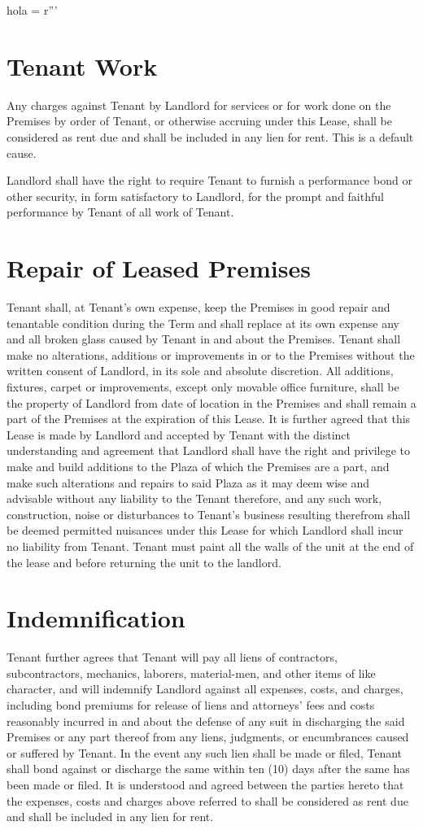 hola = r'''\documentclass{article}
\begin{document}
\section{Tenant Work}
    Any charges against Tenant by Landlord for services or for work done on the Premises by order of Tenant, or otherwise accruing under this Lease, shall be considered as rent due and shall be included in any lien for rent.  This is a default cause.

    Landlord shall have the right to require Tenant to furnish a performance bond or other security, in form satisfactory to Landlord, for the prompt and faithful performance by Tenant of all work of Tenant. 

\section{Repair of Leased Premises}
    Tenant shall, at Tenant's own expense, keep the Premises in good repair and tenantable condition during the Term and shall replace at its own expense any and all broken glass caused by Tenant in and about the Premises. Tenant shall make no alterations, additions or improvements in or to the Premises without the written consent of Landlord, in its sole and absolute discretion. All additions, fixtures, carpet or improvements, except only movable office furniture, shall be the property of Landlord from date of location in the Premises and shall remain a part of the Premises at the expiration of this Lease.
    It is further agreed that this Lease is made by Landlord and accepted by Tenant with the distinct understanding and agreement that Landlord shall have the right and privilege to make and build additions to the Plaza of which the Premises are a part, and make such alterations and repairs to said Plaza as it may deem wise and advisable without any liability to the Tenant therefore, and any such work, construction, noise or disturbances to Tenant’s business resulting therefrom shall be deemed permitted nuisances under this Lease for which Landlord shall incur no liability from Tenant.  Tenant must paint all the walls of the unit at the end of the lease and before returning the unit to the landlord.

\section{Indemnification}
    Tenant further agrees that Tenant will pay all liens of contractors, subcontractors, mechanics, laborers, material-men, and other items of like character, and will indemnify Landlord against all expenses, costs, and charges, including bond premiums for release of liens and attorneys' fees and costs reasonably incurred in and about the defense of any suit in discharging the said Premises or any part thereof from any liens, judgments, or encumbrances caused or suffered by Tenant. In the event any such lien shall be made or filed, Tenant shall bond against or discharge the same within ten (10) days after the same has been made or filed. It is understood and agreed between the parties hereto that the expenses, costs and charges above referred to shall be considered as rent due and shall be included in any lien for rent.
\end{document}
